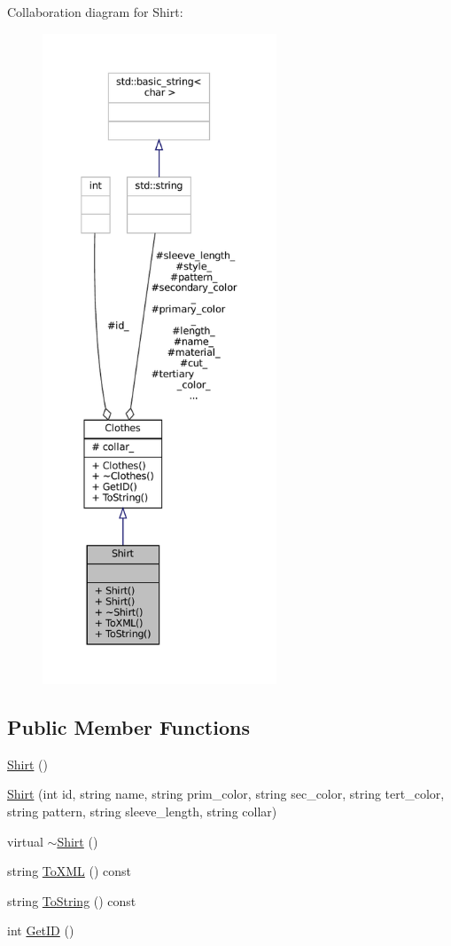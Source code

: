 Collaboration diagram for Shirt\+:\nopagebreak
\begin{figure}[H]
\begin{center}
\leavevmode
\includegraphics[height=550pt]{classShirt__coll__graph}
\end{center}
\end{figure}
\subsection*{Public Member Functions}
\begin{DoxyCompactItemize}
\item 
\mbox{\hyperlink{classShirt_a38664a136cdc92583d8c13a8281905d5}{Shirt}} ()
\item 
\mbox{\hyperlink{classShirt_a5df3975569b7f5874a905d31e4056b7b}{Shirt}} (int id, string name, string prim\+\_\+color, string sec\+\_\+color, string tert\+\_\+color, string pattern, string sleeve\+\_\+length, string collar)
\item 
virtual \mbox{\hyperlink{classShirt_a2cff1b945a014210e8bf009eb4269695}{$\sim$\+Shirt}} ()
\item 
string \mbox{\hyperlink{classShirt_ae636e58135bd1ca4ac590e55e8d47cac}{To\+X\+ML}} () const
\item 
string \mbox{\hyperlink{classShirt_ab85aaa20a603d63f4144d1b42d9b616d}{To\+String}} () const
\item 
int \mbox{\hyperlink{classClothes_a3f6dac172f333126d19010f85ec44e4c}{Get\+ID}} ()
\end{DoxyCompactItemize}
